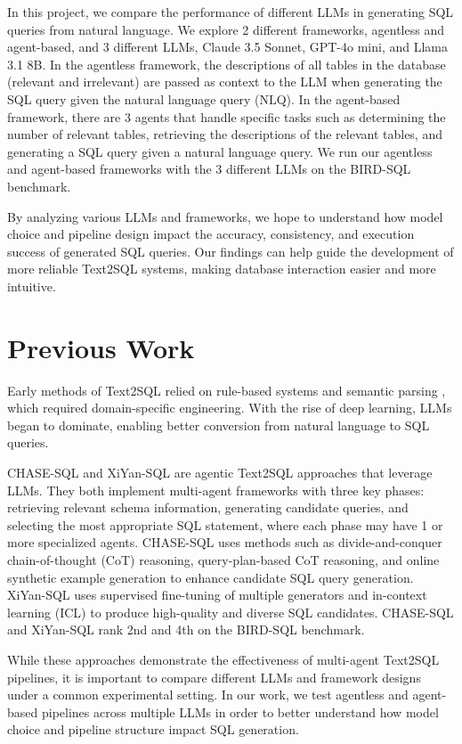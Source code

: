 \documentclass[10pt,twocolumn]{article}
\begin{document}
In this project, we compare the performance of different LLMs in generating SQL queries from natural language. We explore 2 different frameworks, agentless and agent-based, and 3 different LLMs, Claude 3.5 Sonnet, GPT-4o mini, and Llama 3.1 8B. In the agentless framework, the descriptions of all tables in the database (relevant and irrelevant) are passed as context to the LLM when generating the SQL query given the natural language query (NLQ). In the agent-based framework, there are 3 agents that handle specific tasks such as determining the number of relevant tables, retrieving the descriptions of the relevant tables, and generating a SQL query given a natural language query. We run our agentless and agent-based frameworks with the 3 different LLMs on the BIRD-SQL benchmark. 

By analyzing various LLMs and frameworks, we hope to understand how model choice and pipeline design impact the accuracy, consistency, and execution success of generated SQL queries. Our findings can help guide the development of more reliable Text2SQL systems, making database interaction easier and more intuitive.

\section{Previous Work}

Early methods of Text2SQL relied on rule-based systems \cite{rule-based} and semantic parsing \cite{semantic-parsing}, which required domain-specific engineering. With the rise of deep learning, LLMs began to dominate, enabling better conversion from natural language to SQL queries.

CHASE-SQL \cite{chase-sql} and XiYan-SQL \cite{xiyan-sql} are agentic Text2SQL approaches that leverage LLMs. They both implement multi-agent frameworks with three key phases: retrieving relevant schema information, generating candidate queries, and selecting the most appropriate SQL statement, where each phase may have 1 or more specialized agents. CHASE-SQL uses methods such as divide-and-conquer chain-of-thought (CoT) reasoning, query-plan-based CoT reasoning, and online synthetic example generation to enhance candidate SQL query generation. XiYan-SQL uses supervised fine-tuning of multiple generators and in-context learning (ICL) to produce high-quality and diverse SQL candidates. CHASE-SQL and XiYan-SQL rank 2nd and 4th on the BIRD-SQL benchmark.

While these approaches demonstrate the effectiveness of multi-agent Text2SQL pipelines, it is important to compare different LLMs and framework designs under a common experimental setting. In our work, we test agentless and agent-based pipelines across multiple LLMs in order to better understand how model choice and pipeline structure impact SQL generation.
\end{document}
